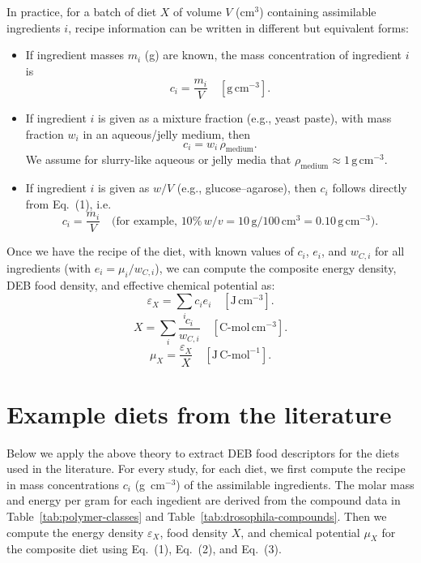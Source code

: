 \documentclass[11pt]{article}
\begin{document}
In practice, for a batch of diet $X$ of volume $V$ (cm$^3$) containing assimilable ingredients $i$, recipe information can be written in different but equivalent forms:
\begin{itemize}
  \item If ingredient masses $m_i$ (g) are known, the mass concentration of ingredient $i$ is
  \begin{equation}
    c_i = \frac{m_i}{V}\quad [\mathrm{g\,cm^{-3}}].
  \end{equation}
  \item If ingredient $i$ is given as a mixture fraction (e.g., yeast paste), with mass fraction $w_i$ in an aqueous/jelly medium, then
  \begin{equation*}
    c_i = w_i\,\rho_{\text{medium}}.
  \end{equation*}
  We assume for slurry-like aqueous or jelly media that $\rho_{\text{medium}}\approx 1\,\mathrm{g\,cm^{-3}}$.
  \item If ingredient $i$ is given as $w/V$ (e.g., glucose--agarose), then $c_i$ follows directly from Eq.~(1), i.e.
  \begin{equation*}
    c_i = \frac{m_i}{V}
    \quad\text{(for example, }10\%\,w/v = 10\,\mathrm{g}/100\,\mathrm{cm^3} = 0.10\,\mathrm{g\,cm^{-3}}\text{).}
  \end{equation*}
\end{itemize}



Once we have the recipe of the diet, with known values of $c_i$, $e_i$, and $w_{C,i}$ for all ingredients (with $e_i=\mu_i/w_{C,i}$), we can compute the composite energy density, DEB food density, and effective chemical potential as:
\begin{equation}
  \varepsilon_X = \sum_i c_i e_i\quad [\mathrm{J\,cm^{-3}}].
\end{equation}
\begin{equation}
  X = \sum_i \frac{c_i}{w_{C,i}}\quad [\mathrm{C\text{-}mol\,cm^{-3}}].
\end{equation}
\begin{equation}
  \mu_X = \frac{\varepsilon_X}{X}\quad [\mathrm{J\,C\text{-}mol^{-1}}].
\end{equation}


\section*{Example diets from the literature}

Below we apply the above theory to extract DEB food descriptors for the diets used in the literature. 
For every study, for each diet, we first compute the recipe in mass concentrations $c_i$ (g~cm$^{-3}$) of the assimilable ingredients.
The molar mass and energy per gram for each ingedient are derived from the compound data in Table~\ref{tab:polymer-classes} and Table~\ref{tab:drosophila-compounds}. 
Then we compute the energy density $\varepsilon_X$, food density $X$, and chemical potential $\mu_X$ for the composite diet using Eq.~(1), Eq.~(2), and Eq.~(3). 
\end{document}
